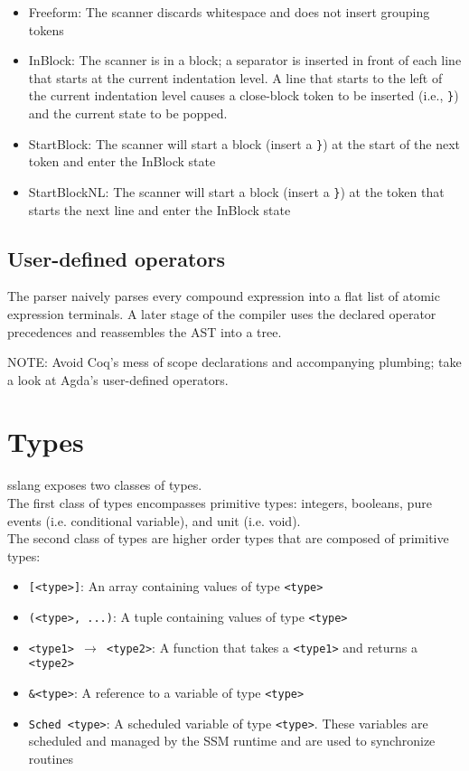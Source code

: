 \documentclass{article}
\begin{document}
\begin{itemize}

\item Freeform: The scanner discards whitespace and does not insert
  grouping tokens

\item InBlock: The scanner is in a block; a separator is inserted in
  front of each line that starts at the current indentation level.  A
  line that starts to the left of the current indentation level causes
  a close-block token to be inserted (i.e., \texttt{\}}) and the
    current state to be popped.

\item StartBlock: The scanner will start a block (insert a \texttt{\}})
at the start of the next token and enter the InBlock state

\item StartBlockNL: The scanner will start a block (insert a
  \texttt{\}}) at the token that starts the next line and enter the InBlock
    state

\end{itemize}

\subsection{User-defined operators}

The parser naively parses every compound expression into a flat list of atomic
expression terminals. A later stage of the compiler uses the declared operator
precedences and reassembles the AST into a tree.

NOTE: Avoid Coq's mess of scope declarations and accompanying plumbing; take
a look at Agda's user-defined operators.

\section{Types}
sslang exposes two classes of types. \\

\noindent The first class of types encompasses primitive types: integers, booleans, pure events (i.e. conditional variable), and unit (i.e. void).\\ 

\noindent The second class of types are higher order types that are composed of primitive types:
\begin{itemize}
    \item \texttt{[<type>]}: An array containing values of type \texttt{<type>}
    \item \texttt{(<type>, ...)}: A tuple containing values of type \texttt{<type>}
    \item \texttt{<type1> $\rightarrow$ <type2>}: A function that takes a   \texttt{<type1>} and returns a  \texttt{<type2>}
    \item \texttt{\&<type>}: A reference to a variable of type \texttt{<type>}
    \item \texttt{Sched <type>}: A scheduled variable of type \texttt{<type>}. These variables are scheduled and managed by the SSM runtime and are used to synchronize routines
\end{itemize}
\end{document}
